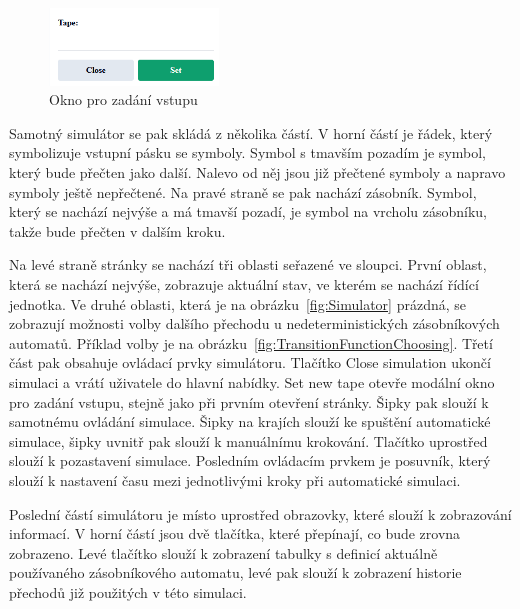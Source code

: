 \begin{figure}[h]
    \centering
    \includegraphics[width=0.4\textwidth]{Figures/PrntScrn_UI_TapeInput.png}
    \caption{Okno pro zadání vstupu}\label{fig:TapeInput}
\end{figure}

Samotný simulátor se pak skládá z několika částí. V horní částí je řádek, který symbolizuje vstupní pásku se symboly. Symbol s tmavším pozadím je symbol, který bude přečten jako další. Nalevo od něj jsou již přečtené symboly a napravo symboly ještě nepřečtené. Na pravé straně se pak nachází zásobník. Symbol, který se nachází nejvýše a má tmavší pozadí, je symbol na vrcholu zásobníku, takže bude přečten v dalším kroku. 

Na levé straně stránky se nachází tři oblasti seřazené ve sloupci. První oblast, která se nachází nejvýše, zobrazuje aktuální stav, ve kterém se nachází řídící jednotka. Ve druhé oblasti, která je na obrázku~\ref{fig:Simulator} prázdná, se zobrazují možnosti volby dalšího přechodu u nedeterministických zásobníkových automatů. Příklad volby je na obrázku~\ref{fig:TransitionFunctionChoosing}. Třetí část pak obsahuje ovládací prvky simulátoru. Tlačítko Close simulation ukončí simulaci a vrátí uživatele do hlavní nabídky. Set new tape otevře modální okno pro zadání vstupu, stejně jako při prvním otevření stránky.
Šipky pak slouží k samotnému ovládání simulace. Šipky na krajích slouží ke spuštění automatické simulace, šipky uvnitř pak slouží k manuálnímu krokování. Tlačítko uprostřed slouží k pozastavení simulace. Posledním ovládacím prvkem je posuvník, který slouží k nastavení času mezi jednotlivými kroky při automatické simulaci.

Poslední částí simulátoru je místo uprostřed obrazovky, které slouží k zobrazování informací. V horní částí jsou dvě tlačítka, které přepínají, co bude zrovna zobrazeno. Levé tlačítko slouží k zobrazení tabulky s definicí aktuálně používaného zásobníkového automatu, levé pak slouží k zobrazení historie přechodů již použitých v této simulaci.

